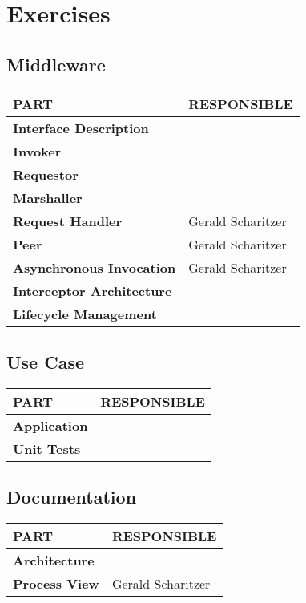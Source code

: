 \documentclass[a4paper]{article}
\begin{document}
\pagestyle{empty}
\section*{Exercises}
\vspace{0.5cm}
\subsection*{Middleware}

\begin{small}
\begin{tabular}{| p{4cm} | p{9cm} |}\hline
\textbf{PART} & \textbf{RESPONSIBLE}\\\hline\hline
\textbf{Interface Description} & \\\hline
\textbf{Invoker} & \\\hline
\textbf{Requestor} & \\\hline
\textbf{Marshaller} & \\\hline
\textbf{Request Handler} & Gerald Scharitzer\\\hline
\textbf{Peer} & Gerald Scharitzer\\\hline
\textbf{Asynchronous Invocation} & Gerald Scharitzer\\\hline
\textbf{Interceptor Architecture} & \\\hline
\textbf{Lifecycle Management} & \\\hline\hline
\end{tabular}
\end{small}

\vspace{1cm}

\subsection*{Use Case}

\begin{small}
\begin{tabular}{| p{4cm} | p{9cm} |}\hline
\textbf{PART} & \textbf{RESPONSIBLE}\\\hline\hline
\textbf{Application} & \\\hline
\textbf{Unit Tests} & \\\hline
\end{tabular}
\end{small}


\vspace{1cm}

\subsection*{Documentation}

\begin{small}
\begin{tabular}{| p{4cm} | p{9cm} |}\hline
\textbf{PART} & \textbf{RESPONSIBLE}\\\hline\hline
\textbf{Architecture} & \\\hline
\textbf{Process View} & Gerald Scharitzer\\\hline
\end{tabular}
\end{small}
\end{document}
